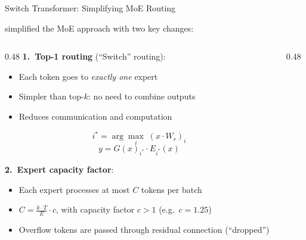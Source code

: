 \begin{frame}{Switch Transformer: Simplifying MoE Routing}

  \cite{fedus2022switch} simplified the MoE approach with two key changes:

  \vspace{0.5em}
  \begin{columns}
    \begin{column}{0.48\textwidth}
      \textbf{1.\ Top-1 routing} (``Switch'' routing):
      \begin{itemize}
        \item Each token goes to \emph{exactly one} expert
        \item Simpler than top-$k$: no need to combine outputs
        \item Reduces communication and computation
      \end{itemize}
      \[
        i^* = \arg\max_i \; (x \cdot W_r)_i
      \]
      \[
        y = G(x)_{i^*} \cdot E_{i^*}(x)
      \]

      \vspace{0.3em}
      \textbf{2.\ Expert capacity factor}:
      \begin{itemize}
        \item Each expert processes at most $C$ tokens per batch
        \item $C = \frac{k \cdot T}{E} \cdot c$, with capacity factor $c > 1$ (e.g.\ $c = 1.25$)
        \item Overflow tokens are passed through residual connection (``dropped'')
      \end{itemize}
    \end{column}
    \begin{column}{0.48\textwidth}
      \begin{center}
\end{center}
\end{column}
\end{columns}
\end{frame}
